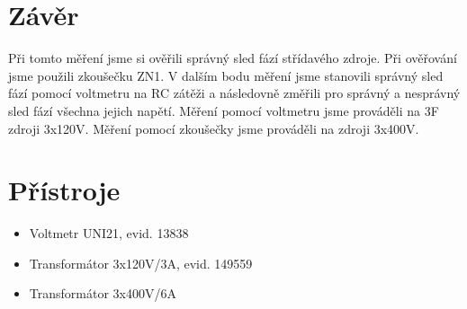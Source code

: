 \documentclass[12pt]{article} %
\begin{document}
\section{Závěr}
Při tomto měření jsme si ověřili správný sled fází střídavého zdroje. Při ověřování jsme použili zkoušečku ZN1. V dalším bodu měření jsme stanovili správný sled fází pomocí voltmetru na RC zátěži a následovně  změřili pro správný a nesprávný sled fází všechna jejich napětí. Měření pomocí voltmetru jsme prováděli na 3F zdroji 3x120V. Měření pomocí zkoušečky jsme prováděli na zdroji 3x400V.

\section{Přístroje}
\begin{itemize}
\item Voltmetr UNI21, evid. 13838
\item Transformátor 3x120V/3A, evid. 149559
\item Transformátor 3x400V/6A
\end{itemize}
\end{document}

